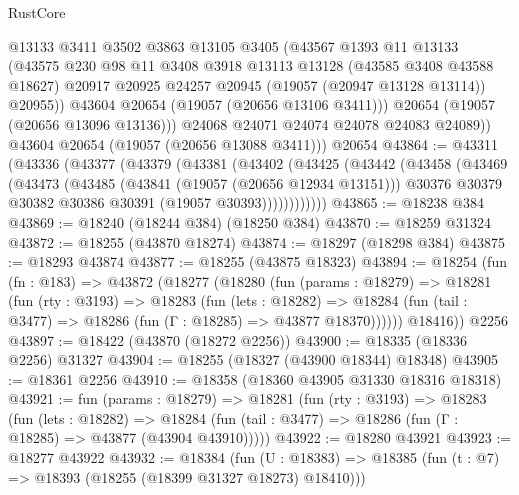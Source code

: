 \begin{lexlean}{RustCore}
\begin{coremodule}
              @13133
              @3411
              @3502
              @3863
              @13105
              @3405
              (@43567
                @1393
                @11
                @13133
                (@43575
                  @230
                  @98
                  @11
                  @3408
                  @3918
                  @13113
                  @13128
                  (@43585 @3408 @43588 @18627)
                  @20917
                  @20925
                  @24257
                  @20945
                  (@19057 (@20947 @13128 @13114))
                  @20955))
              @43604
              @20654
              (@19057 (@20656 @13106 @3411)))
            @20654
            (@19057 (@20656 @13096 @13136)))
          @24068
          @24071
          @24074
          @24078
          @24083
          @24089))
      @43604
      @20654
      (@19057 (@20656 @13088 @3411)))
    @20654
@43864 := @43311
    (@43336
      (@43377
        (@43379
          (@43381
            (@43402
              (@43425
                (@43442
                  (@43458
                    (@43469
                      (@43473
                        (@43485
                          (@43841 (@19057 (@20656 @12934 @13151)))
                          @30376
                          @30379
                          @30382
                          @30386
                          @30391
                          (@19057 @30393))))))))))))
@43865 := @18238 @384
@43869 := @18240 (@18244 @384) (@18250 @384)
@43870 := @18259 @31324
@43872 := @18255 (@43870 @18274)
@43874 := @18297 (@18298 @384)
@43875 := @18293 @43874
@43877 := @18255 (@43875 @18323)
@43894 := @18254
    (fun (fn : @183) =>
    @43872
      (@18277
        (@18280
          (fun (params : @18279) =>
          @18281
            (fun (rty : @3193) =>
            @18283
              (fun (lets : @18282) =>
              @18284 (fun (tail : @3477) => @18286 (fun (Γ : @18285) => @43877 @18370))))))
        @18416))
    @2256
@43897 := @18422 (@43870 (@18272 @2256))
@43900 := @18335 (@18336 @2256) @31327
@43904 := @18255 (@18327 (@43900 @18344) @18348)
@43905 := @18361 @2256
@43910 := @18358 (@18360 @43905 @31330 @18316 @18318)
@43921 := fun (params : @18279) =>
  @18281
    (fun (rty : @3193) =>
    @18283
      (fun (lets : @18282) =>
      @18284 (fun (tail : @3477) => @18286 (fun (Γ : @18285) => @43877 (@43904 @43910)))))
@43922 := @18280 @43921
@43923 := @18277 @43922
@43932 := @18384
    (fun (U : @18383) => @18385 (fun (t : @7) => @18393 (@18255 (@18399 @31327 @18273) @18410)))

\end{coremodule}
\end{lexlean}
